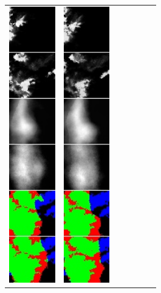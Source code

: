 \begin{figure}[h]
\begin{tabular}{lllllll}
\includegraphics[width=20mm]{abb/prediction/100_maxCont}&
\includegraphics[width=20mm]{abb/prediction/101_maxCont}&

\end{tabular}
\end{figure}
